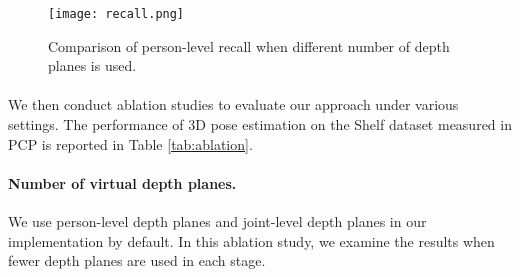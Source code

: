 \documentclass[final]{cvpr}
\begin{document}
\begin{table}[t]
    \centering
    \caption{Ablation study on the Shelf dataset.  and  are the number of depth layers in the person-level and joint-level depth regression modules, respectively.  means different sets of cameras are used for training and evaluation.}
    \label{tab:ablation}
\end{table}


\begin{figure}[t]
    \centering
    \texttt{[image: recall.png]}
    \caption{Comparison of person-level recall when different number of depth planes is used.}
    \label{fig:recall}
    \vspace{-2mm}
\end{figure}


\vspace{-3mm} \paragraph{}
We then conduct ablation studies to evaluate our approach under various settings.
The performance of 3D pose estimation on the Shelf dataset measured in PCP is reported in Table \ref{tab:ablation}.

\vspace{-3mm} \paragraph{Number of virtual depth planes.}
We use  person-level depth planes and  joint-level depth planes in our implementation by default.
In this ablation study, we examine the results when fewer depth planes are used in each stage.
\end{document}
